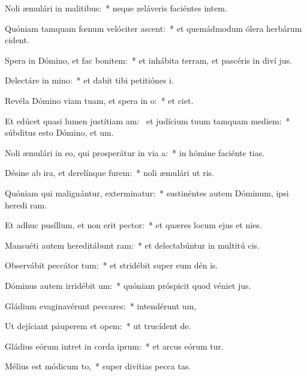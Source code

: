 \item Noli æmulári in malitibus:~* neque zeláveris faciéntes intem.
\item Quóniam tamquam fœnum velóciter ascent:~* et quemádmodum ólera herbárum  cident.
\item Spera in Dómino, et fac bonitem:~* et inhábita terram, et pascéris in diví jus.
\item Delectáre in mino:~* et dabit tibi petitiónes  i.
\item Revéla Dómino viam tuam, et spera in o:~* et  ciet.
\item Et edúcet quasi lumen justítiam am:~\pscross{} et judícium tuum tamquam mediem:~* súbditus esto Dómino, et  um.
\item Noli æmulári in eo, qui prosperátur in via a:~* in hómine faciénte tias.
\item Désine ab ira, et derelínque furem:~* noli æmulári ut ris.
\item Quóniam qui malignántur, exterminatur:~* sustinéntes autem Dóminum, ipsi heredi ram.
\item Et adhuc pusíllum, et non erit pector:~* et quæres locum ejus et  nies.
\item Mansuéti autem hereditábunt ram:~* et delectabúntur in multitú cis.
\item Observábit peccátor tum:~* et stridébit super eum dén is.
\item Dóminus autem irridébit um:~* quóniam próspicit quod véniet  jus.
\item Gládium evaginavérunt peccares:~* intendérunt  um,
\item Ut dejíciant páuperem et opem:~* ut trucídent  de.
\item Gládius eórum intret in corda iprum:~* et arcus eórum tur.
\item Mélius est módicum to,~* super divítias pecca tas.
